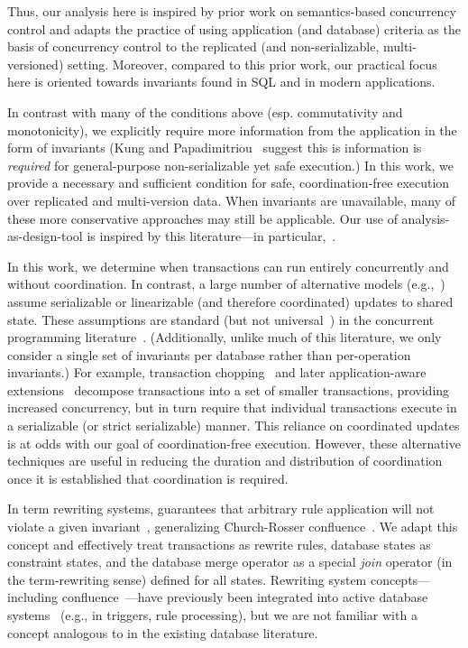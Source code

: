 Thus, our \iconfluence analysis here is inspired by prior work on
semantics-based concurrency control and adapts the practice of using
application (and database) criteria as the basis of concurrency
control to the replicated (and non-serializable, multi-versioned)
setting. Moreover, compared to this prior work, our practical focus
here is oriented towards invariants found in SQL and in modern
applications.

In contrast with many of the conditions above (esp. commutativity and
monotonicity), we explicitly require more information from the
application in the form of invariants (Kung and
Papadimitriou~\cite{kung1979optimality} suggest this is information is
\textit{required} for general-purpose non-serializable yet safe
execution.)  In this work, we provide a necessary and sufficient
condition for safe, coordination-free execution over replicated and
multi-version data. When invariants are unavailable, many of these
more conservative approaches may still be applicable. Our use of
analysis-as-design-tool is inspired by this literature---in
particular,~\cite{kohler-commutativity}.


 In this work, we determine when
transactions can run entirely concurrently and without
coordination. In contrast, a large number of alternative models
(e.g.,~\cite{garciamolina-semantics,korth-serializability,isolation-semantics,local-verification,kemme-si-ic,aiken-confluence,laws-order})
assume serializable or linearizable (and therefore coordinated)
updates to shared state. These assumptions are standard (but not
universal~\cite{ec-txns}) in the concurrent programming
literature~\cite{schneider-concurrent,laws-order}. (Additionally,
unlike much of this literature, we only consider a single set of
invariants per database rather than per-operation invariants.) For
example, transaction chopping~\cite{chopping} and later
application-aware
extensions~\cite{decomp-semantics,agarwal-consistency} decompose
transactions into a set of smaller transactions, providing increased
concurrency, but in turn require that individual transactions execute
in a serializable (or strict serializable) manner.  This reliance on
coordinated updates is at odds with our goal of coordination-free
execution. However, these alternative techniques are useful in
reducing the duration and distribution of coordination once it is
established that coordination is required.

 In term rewriting systems, \iconfluence
guarantees that arbitrary rule application will not violate a given
invariant~\cite{obs-confluence}, generalizing Church-Rosser
confluence~\cite{termrewriting}. We adapt this concept and effectively
treat transactions as rewrite rules, database states as constraint
states, and the database merge operator as a special \textit{join}
operator (in the term-rewriting sense) defined for all
states. Rewriting system concepts---including
confluence~\cite{aiken-confluence}---have previously been integrated
into active database systems~\cite{activedb-book} (e.g., in triggers,
rule processing), but we are not familiar with a concept analogous to
\iconfluence in the existing database literature.

